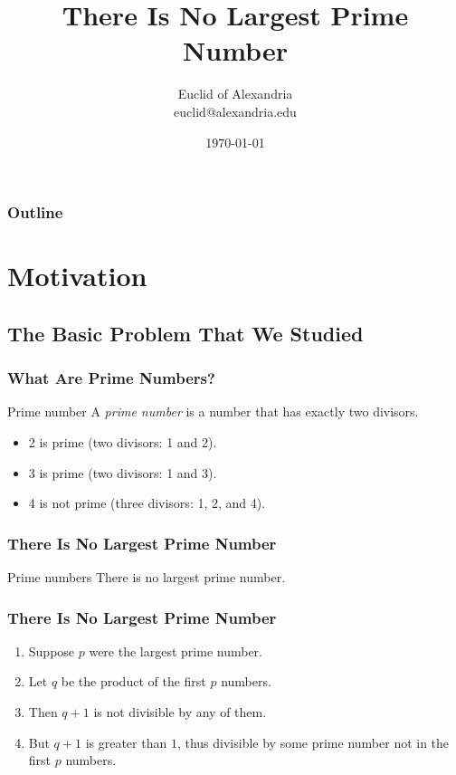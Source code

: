 \documentclass{beamer}
\title{There Is No Largest Prime Number}
\author[Euclid]{Euclid of Alexandria \\ euclid@alexandria.edu}
\date{\today}
\begin{document}
\begin{frame}
\titlepage
\end{frame}


\contentpagetrue
\begin{frame}
\frametitle{Outline}
\tableofcontents
\end{frame}

\section{Motivation}
\subsection{The Basic Problem That We Studied}
\contentpagefalse
\frame{\sectionpage}

\contentpagetrue
\begin{frame}
  \frametitle{What Are Prime Numbers?}
  \begin{Definition}{Prime number}
    A \emph{prime number} is a number that has exactly two divisors.
  \end{Definition}
  \begin{Example}
    \begin{itemize}
      \item 2 is prime (two divisors: 1 and 2).
      \item 3 is prime (two divisors: 1 and 3).
      \item 4 is not prime (\alert{three} divisors: 1, 2, and 4).
    \end{itemize}
  \end{Example}
\end{frame}

\begin{frame}[fragile]
  \frametitle{There Is No Largest Prime Number}%
  \begin{Theorem}{Prime numbers}
    There is no largest prime number.
  \end{Theorem}
\end{frame}


\begin{frame}[fragile]
  \frametitle{There Is No Largest Prime Number}%
  \begin{Proof}
    \begin{enumerate}
      \item<1-> Suppose $p$ were the largest prime number.
      \item<2-> Let $q$ be the product of the first $p$ numbers.
      \item<3-> Then $q + 1$ is not divisible by any of them.
      \item<4-> But $q + 1$ is greater than $1$, thus divisible by some prime number not in the first $p$ numbers.\qedhere
    \end{enumerate}
  \end{Proof}
\end{frame}
\end{document}
